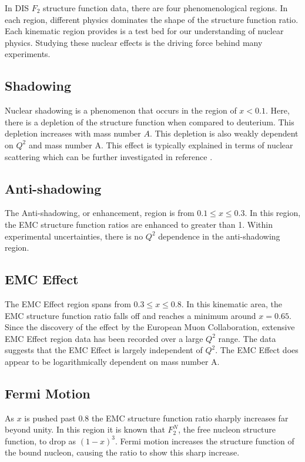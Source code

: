 In DIS $F_2$ structure function data, there are four phenomenological regions. In each region, different physics dominates the shape of the structure function ratio. Each kinematic region provides is a test bed for our understanding of nuclear physics. Studying these nuclear effects is the driving force behind many experiments.\cite{emc_regions,Smirnov99}

\subsection{Shadowing}

Nuclear shadowing is a phenomenon that occurs in the region of $x<0.1$. Here, there is a depletion of the structure function when compared to deuterium. This depletion increases with mass number $A$. This depletion is also weakly dependent on $Q^2$ and mass number A. This effect is typically explained in terms of nuclear scattering which can be further investigated in reference \cite{shadowing}.

\subsection{Anti-shadowing}

The Anti-shadowing, or enhancement, region is from $0.1 \leq x \leq 0.3$. In this region, the EMC structure function ratios are enhanced to greater than 1. Within experimental uncertainties, there is no $Q^2$ dependence in the anti-shadowing region.

\subsection{EMC Effect}

The EMC Effect region spans from $0.3 \leq x \leq 0.8$. In this kinematic area, the EMC structure function ratio falls off and reaches a minimum around $x=0.65$. Since the discovery of the effect by the European Muon Collaboration, extensive EMC Effect region data has been recorded over a large $Q^2$ range. The data suggests that the EMC Effect is largely independent of $Q^2$. The EMC Effect does appear to be logarithmically dependent on mass number A.

\subsection{Fermi Motion}

As $x$ is pushed past $0.8$ the EMC structure function ratio sharply increases far beyond unity. In this region it is known that $F_2^N$, the free nucleon structure function, to drop as $\left(1-x\right)^3$. Fermi motion increases the structure function of the bound nucleon, causing the ratio to show this sharp increase.